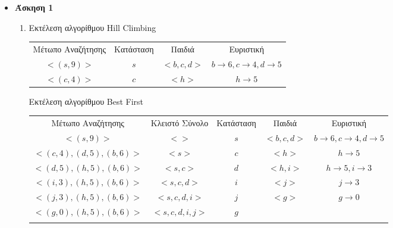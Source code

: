 \documentclass[12pt]{article}
\begin{document}
\begin{itemize}[label=$\blacktriangleright$]
\item \textbf{Άσκηση 1}\\
\begin{enumerate}
\item Εκτέλεση αλγορίθμου \textlatin{Hill Climbing}\\
\begin{table}[H]
\begin{tabular}{cccc}
Μέτωπο Αναζήτησης & Κατάσταση & Παιδιά    & Ευριστική                                    \\
$<(s,9)>$      & $s$       & $<b,c,d>$ & $b\rightarrow6,c\rightarrow4, d\rightarrow5$ \\
$<(c,4)>$         & $c$       & $<h>$     & $h\rightarrow5$                              \\
\end{tabular}
\end{table}
Εκτέλεση αλγορίθμου \textlatin{Best First}\\
\begin{table}[H]
\begin{tabular}{ccccc}
Μέτωπο Αναζήτησης     & Κλειστό Σύνολο  & Κατάσταση & Παιδιά    & Ευριστική                                     \\
$<(s,9)>$             & $<>$           & $s$       & $<b,c,d>$ & $b\rightarrow6 ,c\rightarrow4, d\rightarrow5$ \\
$<(c,4),(d,5),(b,6)>$ & $<s>$         & $c$       & $<h>$     & $h\rightarrow5$                               \\
$<(d,5),(h,5),(b,6)>$ & $<s,c>$       & $d$       & $<h,i>$   & $h\rightarrow5, i\rightarrow3$                \\
$<(i,3),(h,5),(b,6)>$ & $<s,c,d>$     & $i$       & $<j>$     & $j\rightarrow3$                               \\
$<(j,3),(h,5),(b,6)>$ & $<s,c,d,i>$   & $j$       & $<g>$     & $g\rightarrow0$                               \\
$<(g,0),(h,5),(b,6)>$ & $<s,c,d,i,j>$ & $g$       &           &                                               \\
                      &                 &           &           &                                              
\end{tabular}


\end{table}
\end{enumerate}
\end{itemize}
\end{document}
